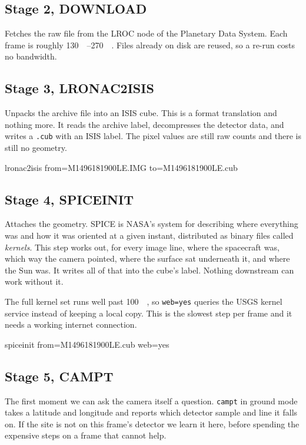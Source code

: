 \documentclass[11pt]{article}
\begin{document}
\subsection{Stage 2, DOWNLOAD}
Fetches the raw file from the LROC node of the Planetary Data System. Each frame is
roughly \SIrange{130}{270}{\mega\byte}. Files already on disk are reused, so a re-run
costs no bandwidth.

\subsection{Stage 3, LRONAC2ISIS}
Unpacks the archive file into an ISIS cube. This is a format translation and nothing
more. It reads the archive label, decompresses the detector data, and writes a
\texttt{.cub} with an ISIS label. The pixel values are still raw counts and there is
still no geometry.
\begin{cmdbox}\begin{cmdv}
lronac2isis from=M1496181900LE.IMG to=M1496181900LE.cub
\end{cmdv}
\end{cmdbox}

\subsection{Stage 4, SPICEINIT}
Attaches the geometry. SPICE is NASA's system for describing where everything was and
how it was oriented at a given instant, distributed as binary files called
\emph{kernels}. This step works out, for every image line, where the spacecraft was,
which way the camera pointed, where the surface sat underneath it, and where the Sun
was. It writes all of that into the cube's label. Nothing downstream can work without
it.

The full kernel set runs well past \SI{100}{\giga\byte}, so \texttt{web=yes} queries
the USGS kernel service instead of keeping a local copy. This is the slowest step per
frame and it needs a working internet connection.
\begin{cmdbox}\begin{cmdv}
spiceinit from=M1496181900LE.cub web=yes
\end{cmdv}
\end{cmdbox}

\subsection{Stage 5, CAMPT}
The first moment we can ask the camera itself a question. \texttt{campt} in ground
mode takes a latitude and longitude and reports which detector sample and line it
falls on. If the site is not on this frame's detector we learn it here, before
spending the expensive steps on a frame that cannot help.
\end{document}
